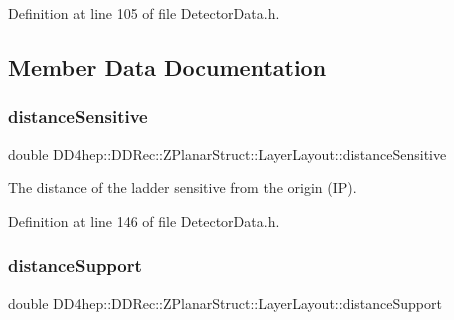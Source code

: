 Definition at line 105 of file Detector\+Data.\+h.



\subsection{Member Data Documentation}
\hypertarget{struct_d_d4hep_1_1_d_d_rec_1_1_z_planar_struct_1_1_layer_layout_a3bff9db37d2d2cb49055c2bd59c69ebd}{}\label{struct_d_d4hep_1_1_d_d_rec_1_1_z_planar_struct_1_1_layer_layout_a3bff9db37d2d2cb49055c2bd59c69ebd} 
\subsubsection{\texorpdfstring{distance\+Sensitive}{distanceSensitive}}
{\footnotesize\ttfamily double D\+D4hep\+::\+D\+D\+Rec\+::\+Z\+Planar\+Struct\+::\+Layer\+Layout\+::distance\+Sensitive}



The distance of the ladder sensitive from the origin (IP). 



Definition at line 146 of file Detector\+Data.\+h.

\hypertarget{struct_d_d4hep_1_1_d_d_rec_1_1_z_planar_struct_1_1_layer_layout_ad8dd683017ec90bd4663b66fce126208}{}\label{struct_d_d4hep_1_1_d_d_rec_1_1_z_planar_struct_1_1_layer_layout_ad8dd683017ec90bd4663b66fce126208} 
\subsubsection{\texorpdfstring{distance\+Support}{distanceSupport}}
{\footnotesize\ttfamily double D\+D4hep\+::\+D\+D\+Rec\+::\+Z\+Planar\+Struct\+::\+Layer\+Layout\+::distance\+Support}



